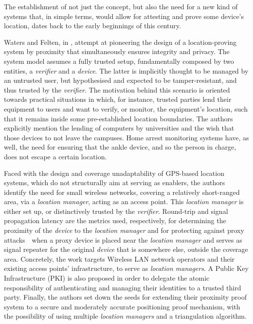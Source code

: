 The establishment of not just the concept, but also the need for a new kind of systems that, in simple terms, would allow for attesting and prove some device's location, dates back to the early beginnings of this century. 

Waters and Felten, in \cite{waters2003secure}, attempt at pioneering the design of a location-proving system by proximity that simultaneously ensures integrity and privacy. The system model assumes a fully trusted setup, fundamentally composed by two entities, a \emph{verifier} and a \emph{device}. The latter is implicitly thought to be managed by an untrusted user, but hypothesised and expected to be tamper-resistant, and thus trusted by the \emph{verifier}. The motivation behind this scenario is oriented towards practical situations in which, for instance, trusted parties lend their equipment to users and want to verify, or monitor, the equipment's location, such that it remains inside some pre-established location boundaries. The authors explicitly mention the lending of computers by universities and the wish that those devices to not leave the campuses. Home arrest monitoring systems have, as well, the need for ensuring that the ankle device, and so the person in charge, does not escape a certain location. 

Faced with the design and coverage unadaptability of GPS-based location systems, which do not structurally aim at serving as \pol{} enablers, the authors identify the need for small wireless networks, covering a relatively short-ranged area, via a \emph{location manager}, acting as an access point. This \emph{location manager} is either set up, or distinctively trusted by the \emph{verifier}. Round-trip and signal propagation latency are the metrics used, respectively, for determining the proximity of the \emph{device} to the \emph{location manager} and for protecting against proxy attacks~\textemdash~when a proxy device is placed near the \emph{location manager} and serves as signal repeater for the original \emph{device} that is somewhere else, outside the coverage area. Concretely, the work targets Wireless LAN network operators and their existing access points' infrastructure, to serve as \emph{location managers}. A Public Key Infrastructure (PKI) is also proposed in order to delegate the atomic responsibility of authenticating and managing their identities to a trusted third party. Finally, the authors set down the seeds for extending their proximity proof system to a secure and moderately accurate positioning proof mechanism, with the possibility of using multiple \emph{location managers} and a triangulation algorithm.

